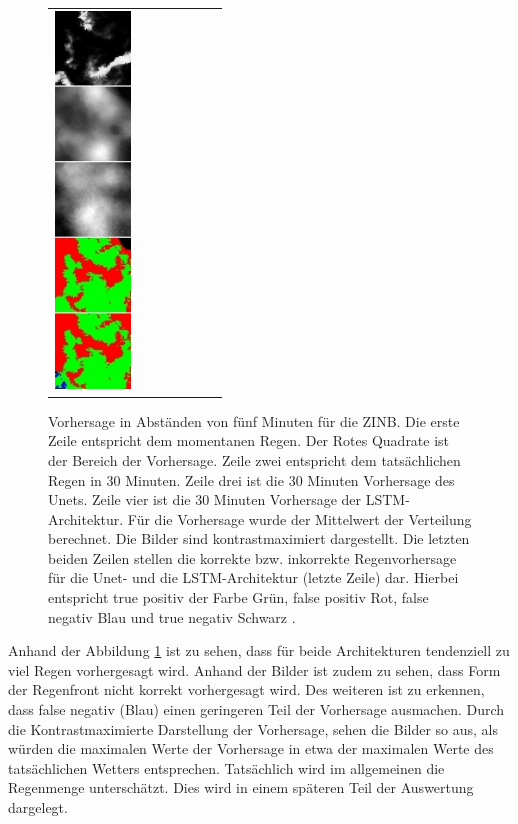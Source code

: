 \begin{figure}[h]
\begin{tabular}{lllllll}
\includegraphics[width=20mm]{abb/prediction/106_maxCont}
\end{tabular}
\caption{Vorhersage in Abständen von fünf Minuten für die ZINB. Die erste Zeile entspricht dem momentanen Regen. Der Rotes Quadrate ist der Bereich der Vorhersage. Zeile zwei entspricht dem tatsächlichen Regen in 30 Minuten. Zeile drei ist die 30 Minuten Vorhersage des Unets. Zeile vier ist die 30 Minuten Vorhersage der LSTM-Architektur. Für die Vorhersage wurde der Mittelwert der Verteilung berechnet. Die Bilder sind kontrastmaximiert dargestellt. Die letzten beiden Zeilen stellen die korrekte bzw. inkorrekte Regenvorhersage für die Unet- und die LSTM-Architektur (letzte Zeile) dar.
Hierbei entspricht true positiv der Farbe Grün, false positiv Rot, false negativ Blau und true negativ Schwarz .\label{fig:predNegBin}}
\end{figure}


\noindent Anhand der Abbildung \ref{fig:predNegBin} ist zu sehen, dass für beide Architekturen tendenziell zu viel Regen vorhergesagt wird. Anhand der Bilder ist zudem zu sehen, dass Form der Regenfront nicht korrekt vorhergesagt wird. Des weiteren ist zu erkennen, dass false negativ (Blau) einen geringeren Teil der Vorhersage ausmachen. Durch die Kontrastmaximierte Darstellung der Vorhersage, sehen die Bilder so aus, als würden die maximalen Werte der Vorhersage in etwa der maximalen Werte des tatsächlichen Wetters entsprechen. Tatsächlich wird im allgemeinen die Regenmenge unterschätzt. Dies wird in einem späteren Teil der Auswertung dargelegt.\\


